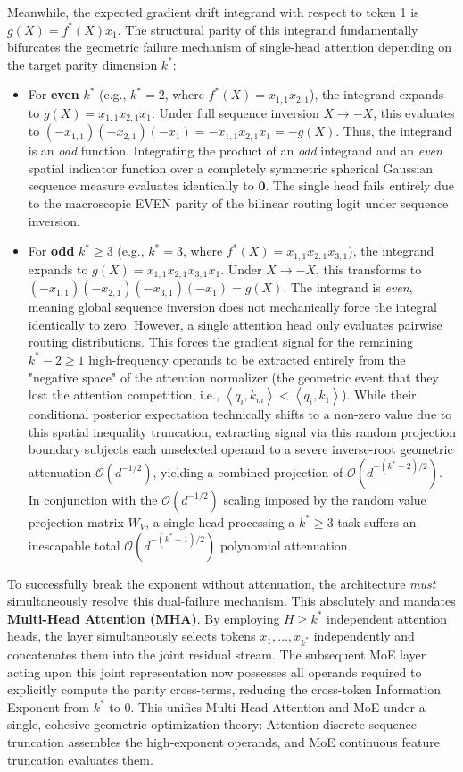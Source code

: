 \documentclass{article}
\newcommand{\1}{\mathbb{I}}
\newcommand{\inner}[2]{\left\langle#1, #2\right\rangle}
\newcommand{\calO}{\mathcal{O}}
\begin{document}
Meanwhile, the expected gradient drift integrand with respect to token 1 is $g(X) = f^*(X) x_1$. The structural parity of this integrand fundamentally bifurcates the geometric failure mechanism of single-head attention depending on the target parity dimension $k^*$:
\begin{itemize}[leftmargin=2em]
    \item For \textbf{even} $k^*$ (e.g., $k^*=2$, where $f^*(X) = x_{1,1} x_{2,1}$), the integrand expands to $g(X) = x_{1,1} x_{2,1} x_1$. Under full sequence inversion $X \to -X$, this evaluates to $(-x_{1,1})(-x_{2,1})(-x_1) = -x_{1,1} x_{2,1} x_1 = -g(X)$. Thus, the integrand is an \textit{odd} function. Integrating the product of an \textit{odd} integrand and an \textit{even} spatial indicator function over a completely symmetric spherical Gaussian sequence measure evaluates identically to $\mathbf{0}$. The single head fails entirely due to the macroscopic EVEN parity of the bilinear routing logit under sequence inversion.
    \item For \textbf{odd} $k^* \ge 3$ (e.g., $k^*=3$, where $f^*(X) = x_{1,1} x_{2,1} x_{3,1}$), the integrand expands to $g(X) = x_{1,1} x_{2,1} x_{3,1} x_1$. Under $X \to -X$, this transforms to $(-x_{1,1})(-x_{2,1})(-x_{3,1})(-x_1) = g(X)$. The integrand is \textit{even}, meaning global sequence inversion does not mechanically force the integral identically to zero. However, a single attention head only evaluates pairwise routing distributions. This forces the gradient signal for the remaining $k^*-2 \ge 1$ high-frequency operands to be extracted entirely from the "negative space" of the attention normalizer (the geometric event that they lost the attention competition, i.e., $\inner{q_i}{k_m} < \inner{q_i}{k_1}$). While their conditional posterior expectation technically shifts to a non-zero value due to this spatial inequality truncation, extracting signal via this random projection boundary subjects each unselected operand to a severe inverse-root geometric attenuation $\calO(d^{-1/2})$, yielding a combined projection of $\calO(d^{-(k^*-2)/2})$. In conjunction with the $\calO(d^{-1/2})$ scaling imposed by the random value projection matrix $W_V$, a single head processing a $k^* \ge 3$ task suffers an inescapable total $\calO(d^{-(k^*-1)/2})$ polynomial attenuation.
\end{itemize}

To successfully break the exponent without attenuation, the architecture \textit{must} simultaneously resolve this dual-failure mechanism. This absolutely and mandates \textbf{Multi-Head Attention (MHA)}. By employing $H \ge k^*$ independent attention heads, the layer simultaneously selects tokens $x_1, \dots, x_{k^*}$ independently and concatenates them into the joint residual stream. The subsequent MoE layer acting upon this joint representation now possesses all operands required to explicitly compute the parity cross-terms, reducing the cross-token Information Exponent from $k^*$ to $0$. This unifies Multi-Head Attention and MoE under a single, cohesive geometric optimization theory: Attention discrete sequence truncation assembles the high-exponent operands, and MoE continuous feature truncation evaluates them.
\end{document}
